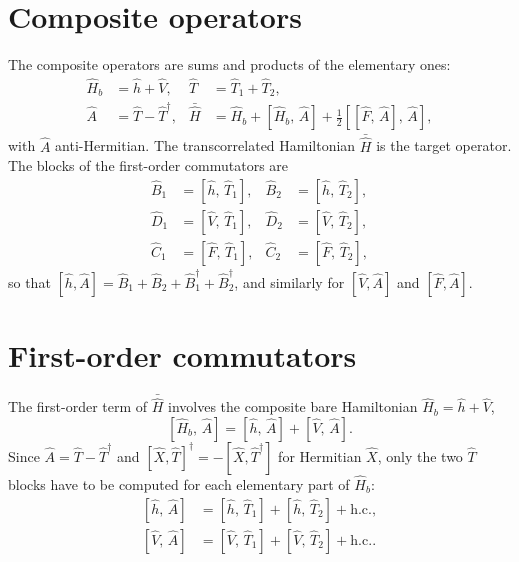 \documentclass[11pt]{article}
\newcommand{\hc}{+\mathrm{h.c.}}
\begin{document}
\section{Composite operators}
The composite operators are sums and products of the elementary ones:
\begin{align}
\hat{H}_b &= \hat{h} + \hat{V}, & \hat{T} &= \hat{T}_1 + \hat{T}_2, \\
\hat{A} &= \hat{T} - \hat{T}^\dagger, & \bar{\hat{H}} &= \hat{H}_b + \left[\hat{H}_b,\, \hat{A}\right] + \tfrac{1}{2}\left[\left[\hat{F},\, \hat{A}\right],\, \hat{A}\right],
\end{align}
with $\hat{A}$ anti-Hermitian.  The transcorrelated Hamiltonian $\bar{\hat{H}}$ is the target operator.  The blocks of the first-order commutators are
\begin{align}
\hat{B}_1 &= \left[\hat{h},\, \hat{T}_{1}\right], & \hat{B}_2 &= \left[\hat{h},\, \hat{T}_{2}\right], \\
\hat{D}_1 &= \left[\hat{V},\, \hat{T}_{1}\right], & \hat{D}_2 &= \left[\hat{V},\, \hat{T}_{2}\right], \\
\hat{C}_1 &= \left[\hat{F},\, \hat{T}_{1}\right], & \hat{C}_2 &= \left[\hat{F},\, \hat{T}_{2}\right],
\end{align}
so that $[\hat{h}, \hat{A}] = \hat{B}_1 + \hat{B}_2 + \hat{B}_1^\dagger + \hat{B}_2^\dagger$, and similarly for $[\hat{V}, \hat{A}]$ and $[\hat{F}, \hat{A}]$.

\section{First-order commutators}
The first-order term of $\bar{\hat{H}}$ involves the composite bare Hamiltonian $\hat{H}_b = \hat{h} + \hat{V}$,
\begin{equation}
\left[\hat{H}_{b},\, \hat{A}\right] = \left[\hat{h},\, \hat{A}\right] + \left[\hat{V},\, \hat{A}\right].
\end{equation}
Since $\hat{A} = \hat{T} - \hat{T}^\dagger$ and $[\hat{X}, \hat{T}]^\dagger = -[\hat{X}, \hat{T}^\dagger]$ for Hermitian $\hat{X}$, only the two $\hat{T}$ blocks have to be computed for each elementary part of $\hat{H}_b$:
\begin{align}
\left[\hat{h},\, \hat{A}\right] &= \left[\hat{h},\, \hat{T}_{1}\right] + \left[\hat{h},\, \hat{T}_{2}\right] \hc, \\
\left[\hat{V},\, \hat{A}\right] &= \left[\hat{V},\, \hat{T}_{1}\right] + \left[\hat{V},\, \hat{T}_{2}\right] \hc.
\end{align}
\end{document}
